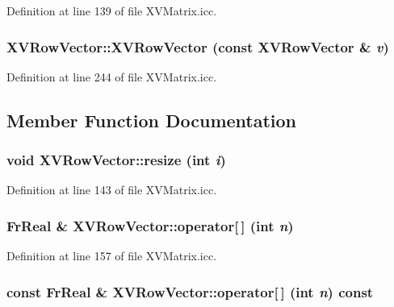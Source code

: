 Definition at line 139 of file XVMatrix.icc.\label{XVRowVector_a2}
\hypertarget{class_XVRowVector_a2}{
\subsubsection[XVRowVector]{\setlength{\rightskip}{0pt plus 5cm}XVRow\-Vector::XVRow\-Vector (const XVRow\-Vector \& {\em v})}}




Definition at line 244 of file XVMatrix.icc.

\subsection{Member Function Documentation}
\label{XVRowVector_a3}
\hypertarget{class_XVRowVector_a3}{
\subsubsection[resize]{\setlength{\rightskip}{0pt plus 5cm}void XVRow\-Vector::resize (int {\em i})}}




Definition at line 143 of file XVMatrix.icc.\label{XVRowVector_a4}
\hypertarget{class_XVRowVector_a4}{
\subsubsection[operator{}]{\setlength{\rightskip}{0pt plus 5cm}Fr\-Real \& XVRow\-Vector::operator\mbox{[}$\,$\mbox{]} (int {\em n})}}




Definition at line 157 of file XVMatrix.icc.\label{XVRowVector_a5}
\hypertarget{class_XVRowVector_a5}{
\subsubsection[operator{}]{\setlength{\rightskip}{0pt plus 5cm}const Fr\-Real \& XVRow\-Vector::operator\mbox{[}$\,$\mbox{]} (int {\em n}) const}}





